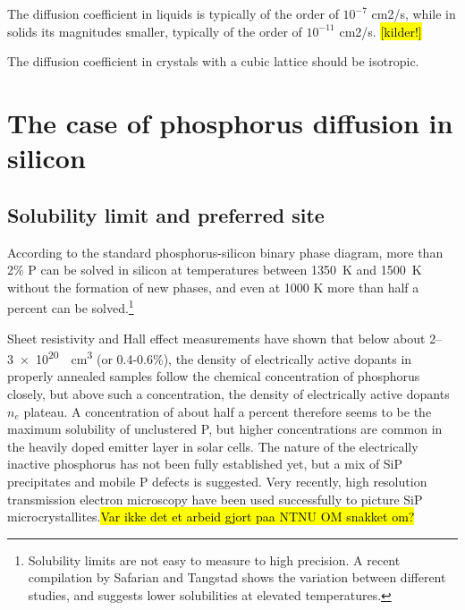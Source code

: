 \documentclass[11pt,bibliography=totoc,index=totoc]{scrbook}   %
\newcommand{\comment}[1]{\hl{#1}}
\begin{document}
The diffusion coefficient in liquids is typically of the order of $10^{-7}$ cm2/s,
while in solids its magnitudes smaller, typically of the order of $10^{-11}$ cm2/s. \comment{[kilder!]}


The diffusion coefficient in crystals with a cubic lattice should be isotropic.

%
\section{The case of phosphorus diffusion in silicon}\label{sec:P}
%

%
\subsection{Solubility limit and preferred site}\label{sec:PSolubility}
%

According to the standard phosphorus-silicon binary phase diagram,\cite{PSiPhaseDiagram} more than 2\% P can be solved in silicon at temperatures between \SI{1350}{\kelvin} and \SI{1500}{\kelvin} without the formation of new phases, and even at 1000 K more than half a percent can be solved.\footnote{Solubility limits are not easy to measure to high precision. A recent compilation by Safarian and Tangstad shows the variation between different studies, and suggests lower solubilities at elevated temperatures.\cite{Safarian:2011}}

Sheet resistivity and Hall effect measurements have shown that below about 2–\SI{3e20}{\per\centi\metre\cubed} (or 0.4-0.6\%), the density of electrically active dopants in properly annealed samples follow the chemical concentration of phosphorus closely, but above such a concentration, the density of electrically active dopants $n_e$ plateau.\cite{Tannenbaum:1961}
A concentration of about half a percent therefore seems to be the maximum solubility of unclustered P,\cite{Solmi:1998} but higher concentrations
are common in the heavily doped emitter layer in solar cells.\cite{Bentzen:2006b}
The nature of the electrically inactive phosphorus has not been fully established yet, but a mix of SiP precipitates and mobile P defects is suggested.\cite{Armigliato:1976}\cite{Solmi:1996} 
Very recently, high resolution transmission electron microscopy have been used successfully to picture SiP microcrystallites.\comment{Var ikke det et arbeid gjort paa NTNU OM snakket om?}
\end{document}
